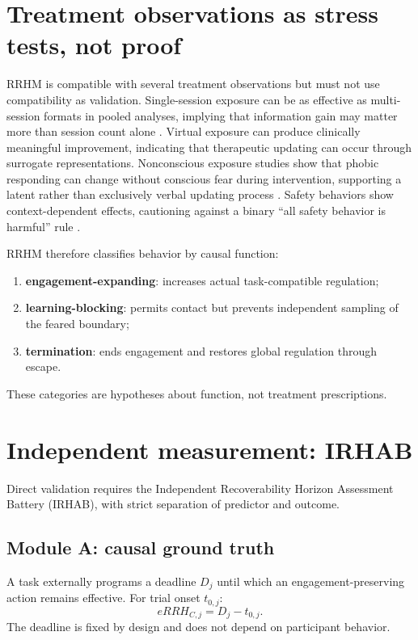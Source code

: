 \documentclass[9pt,twocolumn]{article}
\begin{document}
\section{Treatment observations as stress tests, not proof}
RRHM is compatible with several treatment observations but must not use compatibility as validation. Single-session exposure can be as effective as multi-session formats in pooled analyses, implying that information gain may matter more than session count alone \cite{odgers2022}. Virtual exposure can produce clinically meaningful improvement, indicating that therapeutic updating can occur through surrogate representations. Nonconscious exposure studies show that phobic responding can change without conscious fear during intervention, supporting a latent rather than exclusively verbal updating process \cite{siegel2025}. Safety behaviors show context-dependent effects, cautioning against a binary ``all safety behavior is harmful'' rule \cite{meckes2025}.

RRHM therefore classifies behavior by causal function:
\begin{enumerate}
\item \textbf{engagement-expanding}: increases actual task-compatible regulation;
\item \textbf{learning-blocking}: permits contact but prevents independent sampling of the feared boundary;
\item \textbf{termination}: ends engagement and restores global regulation through escape.
\end{enumerate}

These categories are hypotheses about function, not treatment prescriptions.

\section{Independent measurement: IRHAB}
Direct validation requires the Independent Recoverability Horizon Assessment Battery (IRHAB), with strict separation of predictor and outcome.

\subsection{Module A: causal ground truth}
A task externally programs a deadline $D_j$ until which an engagement-preserving action remains effective. For trial onset $t_{0,j}$:
\[
 eRRH_{C,j}=D_j-t_{0,j}.
\]
The deadline is fixed by design and does not depend on participant behavior.
\end{document}
